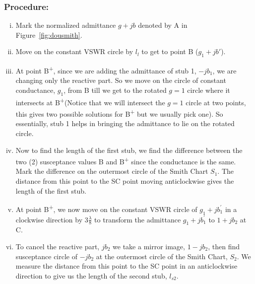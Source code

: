 \subsubsection*{Procedure:}
\begin{enumerate}[(i)]
\item Mark the normalized admittance $g + jb$ denoted by A in Figure~\ref{fig:dousmith}.
\item Move on the constant VSWR circle by $l_l$ to get to point B\textsuperscript{\textemdash} ($g_1 + jb'$).
\item At point B\textsuperscript{+}, since we are adding the admittance of stub 1, $-jb_{1}$, we are changing only the reactive part. So we move on the circle of constant conductance, $g_1$, from B\textsuperscript{\textemdash} till we get to the rotated $g = 1$ circle where it intersects at B\textsuperscript{+}(Notice that we will intersect the $g = 1$ circle at two points, this gives two possible solutions for B\textsuperscript{+} but we usually pick one). So essentially, stub 1 helps in bringing the admittance to lie on the rotated circle.
\item Now to find the length of the first stub, we find the difference between the two (2) susceptance values B\textsuperscript{\textemdash} and B\textsuperscript{+} since the conductance is the same. Mark the difference on the outermost circle of the Smith Chart $S_1$. The distance from this point to the SC point moving anticlockwise gives the length of the first stub.
\item At point B\textsuperscript{+}, we now move on the constant VSWR circle of $g_{1} + jb_1^{'}$ in a clockwise direction by $ 3\frac{\lambda}{8}$ to transform the admittance $g_1 + jb_1^{'}$ to $1 + jb_2$ at C\textsuperscript{\textemdash}.
\item To cancel the reactive part, $jb_2$ we take a mirror image, $1-jb_2$, then find susceptance circle of $-jb_2$ at the outermost circle of the Smith Chart, $S_2$. We measure the distance from this point to the SC point in an anticlockwise direction to give us the length of the second stub, $l_{s2}$.
\end{enumerate}

